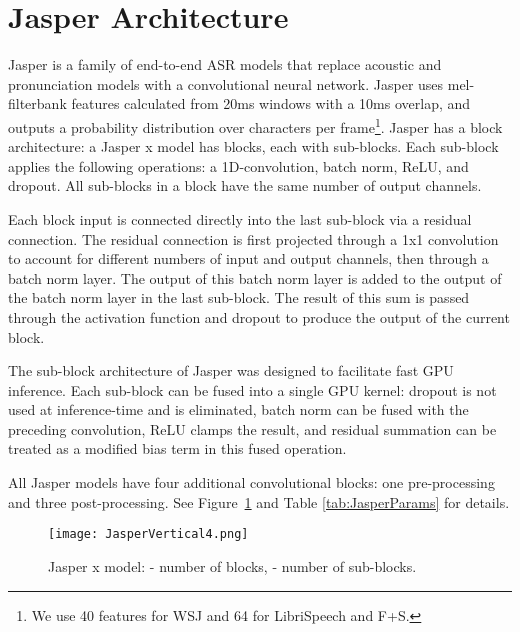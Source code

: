 \documentclass[a4paper]{article}
\begin{document}
\section{Jasper Architecture}

Jasper is a family of end-to-end ASR models that replace acoustic and pronunciation models with a convolutional neural network. Jasper uses mel-filterbank features calculated from 20ms windows with a 10ms overlap, and outputs a probability distribution over characters per frame\footnote{We use 40 features for WSJ and 64 for LibriSpeech and F+S.}. Jasper has a block architecture: a Jasper x model has  blocks, each with  sub-blocks. Each sub-block applies the following operations: a 1D-convolution, batch norm, ReLU, and dropout. All sub-blocks in a block have the same number of output channels.

Each block input is connected directly into the last sub-block via a residual connection.  The residual connection is first projected through a 1x1 convolution to account for different numbers of input and output channels, then through a batch norm layer. The output of this batch norm layer is added to the output of the batch norm layer in the last sub-block. The result of this sum is passed through the activation function and dropout to produce the output of the current block. 

The sub-block architecture of Jasper was designed to facilitate fast GPU inference. Each sub-block can be fused into a single GPU kernel: dropout is not used at inference-time and is eliminated, batch norm can be fused with the preceding convolution, ReLU clamps the result, and residual summation can be treated as a modified bias term in this fused operation.

All Jasper models have four additional convolutional blocks: one pre-processing and three post-processing. See Figure~\ref{fig:jasper_arch} and Table \ref{tab:JasperParams} for details.

\begin{figure}[t]
  \centering
  \texttt{[image: JasperVertical4.png]}
  \caption{Jasper x model:  - number of blocks,  - number of sub-blocks.}
  \label{fig:jasper_arch}
\end{figure}
\end{document}

